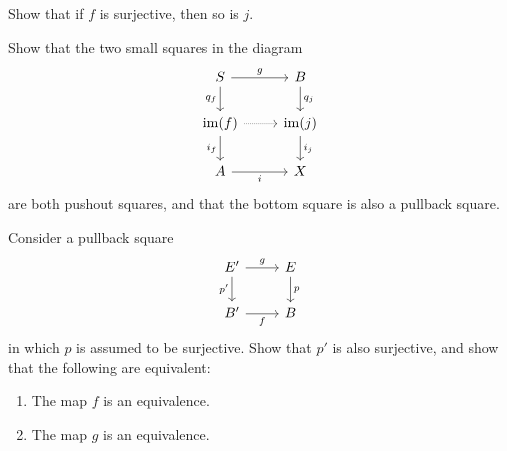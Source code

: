 \begin{exercises}
  \begin{subexenum}
  \item Show that if $f$ is surjective, then so is $j$.
  \item Show that the two small squares in the diagram
    \begin{equation*}
      \begin{tikzcd}
        S \arrow[r,"g"] \arrow[d,swap,"q_f"] & B \arrow[d,"q_j"] \\
        \im(f) \arrow[r,densely dotted] \arrow[d,swap,"i_f"] & \im(j) \arrow[d,"i_j"] \\
        A \arrow[r,swap,"i"] & X
      \end{tikzcd}
    \end{equation*}
    are both pushout squares, and that the bottom square is also a pullback square.
  \end{subexenum}
  \exercise Consider a pullback square
  \begin{equation*}
    \begin{tikzcd}
      E' \arrow[d,swap,"{p'}"] \arrow[r,"g"] & E \arrow[d,"p"] \\
      B' \arrow[r,swap,"f"] & B
    \end{tikzcd}
  \end{equation*}
  in which $p$ is assumed to be surjective. Show that $p'$ is also surjective, and show that the following are equivalent:
  \begin{enumerate}
  \item The map $f$ is an equivalence.
  \item The map $g$ is an equivalence.
  \end{enumerate}
\end{exercises}

\endinput

\begin{thm}
Consider a commuting triangle
\begin{equation*}
\begin{tikzcd}[column sep=small]
A \arrow[rr,"i"] \arrow[dr,swap,"f"] & & B \arrow[dl,"m"] \\
& X
\end{tikzcd}
\end{equation*}
with $I:f\htpy m\circ i$, where $m$ is an embedding. The following are equivalent:
\begin{enumerate}
\item $m$ satisfies the universal property of the image of $f$.
\item for each $x:X$, the proposition $\fib{m}{x}$ satisfies the universal property of the propositional truncation of $\fib{f}{x}$.
\end{enumerate}
\end{thm}
